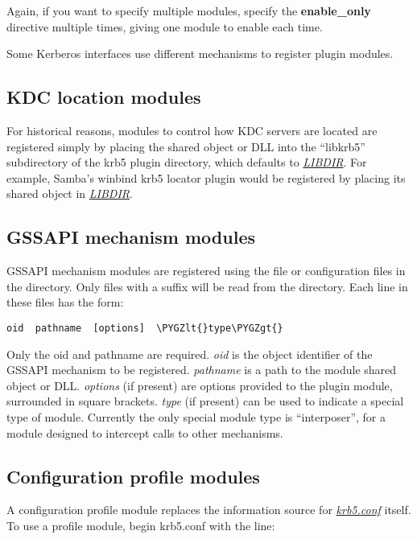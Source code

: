 \documentclass[letterpaper,10pt,english]{sphinxmanual}
\def\PYGZlt{\char`\<}
\def\PYGZgt{\char`\>}
\begin{document}
Again, if you want to specify multiple modules, specify the
\textbf{enable\_only} directive multiple times, giving one module to enable
each time.

Some Kerberos interfaces use different mechanisms to register plugin
modules.


\subsection{KDC location modules}
\label{admin/host_config:kdc-location-modules}
For historical reasons, modules to control how KDC servers are located
are registered simply by placing the shared object or DLL into the
``libkrb5'' subdirectory of the krb5 plugin directory, which defaults to
{\hyperref[mitK5defaults:paths]{\emph{LIBDIR}}}.  For example, Samba's winbind krb5
locator plugin would be registered by placing its shared object in
{\hyperref[mitK5defaults:paths]{\emph{LIBDIR}}}.


\subsection{GSSAPI mechanism modules}
\label{admin/host_config:gssapi-plugin-config}\label{admin/host_config:gssapi-mechanism-modules}
GSSAPI mechanism modules are registered using the file
 or configuration files in the 
directory.  Only files with a  suffix will be read from the
 directory.  Each line in these files has the
form:

\begin{Verbatim}[commandchars=\\\{\}]
oid  pathname  [options]  \PYGZlt{}type\PYGZgt{}
\end{Verbatim}

Only the oid and pathname are required.  \emph{oid} is the object
identifier of the GSSAPI mechanism to be registered.  \emph{pathname} is a
path to the module shared object or DLL.  \emph{options} (if present) are
options provided to the plugin module, surrounded in square brackets.
\emph{type} (if present) can be used to indicate a special type of module.
Currently the only special module type is ``interposer'', for a module
designed to intercept calls to other mechanisms.


\subsection{Configuration profile modules}
\label{admin/host_config:profile-plugin-config}\label{admin/host_config:configuration-profile-modules}
A configuration profile module replaces the information source for
{\hyperref[admin/conf_files/krb5_conf:krb5-conf-5]{\emph{krb5.conf}}} itself.  To use a profile module, begin krb5.conf
with the line:
\end{document}

